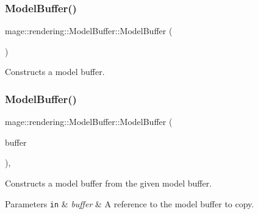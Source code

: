 \subsubsection{\texorpdfstring{Model\+Buffer()}{ModelBuffer()}\hspace{0.1cm}{\footnotesize\ttfamily [1/3]}}
{\footnotesize\ttfamily mage\+::rendering\+::\+Model\+Buffer\+::\+Model\+Buffer (\begin{DoxyParamCaption}{ }\end{DoxyParamCaption})\hspace{0.3cm}{\ttfamily [noexcept]}}

Constructs a model buffer. \hypertarget{structmage_1_1rendering_1_1_model_buffer_a2a70d56be64cc621e61e056fb08d6905}{}\label{structmage_1_1rendering_1_1_model_buffer_a2a70d56be64cc621e61e056fb08d6905} 
\subsubsection{\texorpdfstring{Model\+Buffer()}{ModelBuffer()}\hspace{0.1cm}{\footnotesize\ttfamily [2/3]}}
{\footnotesize\ttfamily mage\+::rendering\+::\+Model\+Buffer\+::\+Model\+Buffer (\begin{DoxyParamCaption}\item[{const \hyperlink{structmage_1_1rendering_1_1_model_buffer}{Model\+Buffer} \&}]{buffer }\end{DoxyParamCaption})\hspace{0.3cm}{\ttfamily [default]}, {\ttfamily [noexcept]}}

Constructs a model buffer from the given model buffer.


\begin{DoxyParams}[1]{Parameters}
\mbox{\tt in}  & {\em buffer} & A reference to the model buffer to copy. \\
\hline
\end{DoxyParams}
\hypertarget{structmage_1_1rendering_1_1_model_buffer_aa562199c2433c47baabaf32743b1a124}{}\label{structmage_1_1rendering_1_1_model_buffer_aa562199c2433c47baabaf32743b1a124} 
